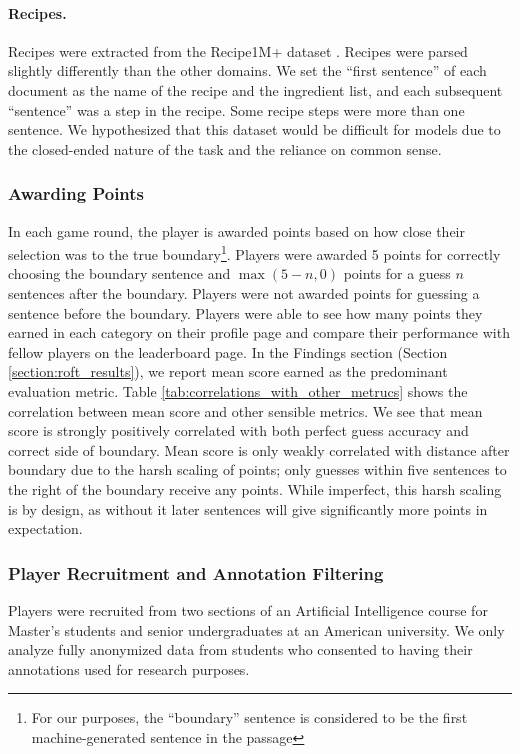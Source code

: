 \paragraph{Recipes.}
Recipes were extracted from the Recipe1M+ dataset \cite{marin2019learning}.
Recipes were parsed slightly differently than the other domains.
We set the ``first sentence'' of each document as the name of the recipe and the ingredient list, and each subsequent ``sentence'' was a step in the recipe. Some recipe steps were more than one sentence. We hypothesized that this dataset would be difficult for models due to the closed-ended nature of the task and the reliance on common sense. 

\subsubsection{Awarding Points}
\label{sec:points}
In each game round, the player is awarded points based on how close their selection was to the true boundary\footnote{For our purposes, the ``boundary'' sentence is considered to be the first machine-generated sentence in the passage}.
Players were awarded 5 points for correctly choosing the boundary sentence and $\max(5-n, 0)$ points for a guess $n$ sentences after the boundary.
Players were not awarded points for guessing a sentence before the boundary.
Players were able to see how many points they earned in each category on their profile page and compare their performance with fellow players on the leaderboard page.
In the Findings section (Section \ref{section:roft_results}), we report mean score earned as the predominant evaluation metric. 
Table \ref{tab:correlations_with_other_metrucs} shows the correlation between mean score and other sensible metrics.
We see that mean score is strongly positively correlated with both perfect guess accuracy and correct side of boundary. Mean score is only weakly correlated with distance after boundary due to the harsh scaling of points; only guesses within five sentences to the right of the boundary receive any points. While imperfect, this harsh scaling is by design, as without it later sentences will give significantly more points in expectation.


\subsubsection{Player Recruitment and Annotation Filtering}
\label{sec:players}
Players were recruited from two sections of an Artificial Intelligence course for Master's students and senior undergraduates at an American university.
We only analyze fully anonymized data from students who consented to having their annotations used for research purposes.

